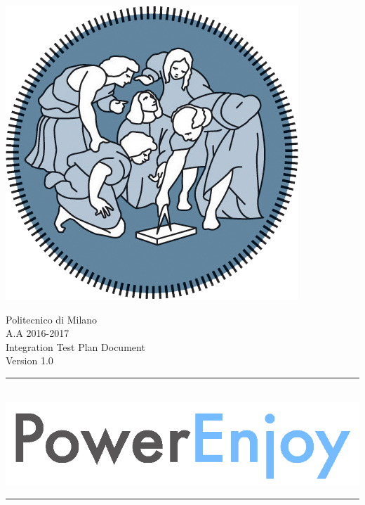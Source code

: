 \documentclass[12pt]{article}
\begin{document}
   
	\begin{center}
 	 	\includegraphics[scale=1.5]{Images/PolimiLogo.png}
	\end{center}

	\begin{center}
	 	{\Huge Politecnico di Milano}\\
	 	\vspace{5mm}
		{\Large A.A 2016-2017} 
		\vspace{5mm}\\
		{\huge Integration Test Plan Document}   
		\vspace{5mm}\\
		{\large Version 1.0}  
    \end{center}
     
    \begin{center}
		\noindent\rule{8cm}{0.8pt}
		 \vspace{5mm}\\
 	 	 \includegraphics[scale=1]{Images/logoPowerEnjoy2.png}\\
		\noindent\rule{8cm}{0.8pt}
	\end{center}
	 	\vspace{5mm}
	 		
\end{document}
